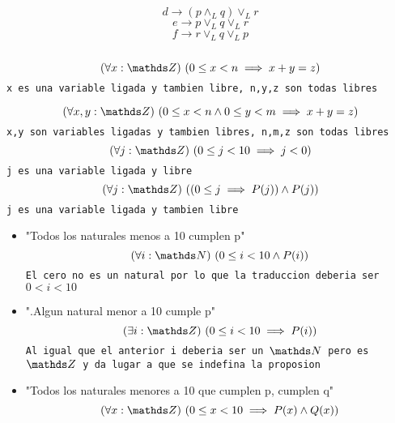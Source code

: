 \documentclass[10pt,a4paper,2in]{article}
\begin{document}
\begin{equation*}
    d\longrightarrow (p\land_L q) \lor_L r
\end{equation*}
\begin{equation*}
    e\longrightarrow p\lor_L q \lor_L r
\end{equation*}
\begin{equation*}
    f\longrightarrow r\lor_L q \lor_L p
\end{equation*}
\pagebreak\\
\begin{equation*}
    \paraTodo[unalinea]{x}{\ent}{0\leq x < n \implies x+y=z}
\end{equation*}
\texttt{x es una variable ligada y tambien libre, {n,y,z} son todas libres}

\begin{equation*}
    \paraTodo[unalinea]{x,y}{\ent}{0\leq x < n \land 0\leq y < m \implies x+y=z}
\end{equation*}
\texttt{{x,y} son variables ligadas y tambien libres, {n,m,z} son todas libres}
\begin{equation*}
    \paraTodo[unalinea]{j}{\ent}{0\leq j < 10 \implies j<0}
\end{equation*}
\texttt{j es una variable ligada y libre}
\begin{equation*}
    \paraTodo[unalinea]{j}{\ent}{(0\leq j \implies P(j))\land P(j)}
\end{equation*}
\texttt{j es una variable ligada y tambien libre}

\begin{itemize}
    \item "Todos los naturales menos a 10 cumplen p"\\
\begin{equation*}
    \paraTodo[unalinea]{i}{\nat}{0\leq i<10 \land P(i)}
\end{equation*}
\texttt{El cero no es un natural por lo que la traduccion deberia ser $0<i<10$}
    \item ".Algun natural menor a 10 cumple p"
\begin{equation*}
    \existe[unalinea]{i}{\ent}{0\leq i < 10 \implies P(i)}
\end{equation*}
\texttt{Al igual que el anterior i deberia ser un $\nat$ pero es $\ent$ y da lugar a que se indefina la proposion}
\item "Todos los naturales menores a 10 que cumplen p, cumplen q"
\begin{equation*}
    \paraTodo[unalinea]{x}{\ent}{0\leq x < 10 \implies P(x) \land Q(x)}
\end{equation*}
\end{itemize}
\end{document}
